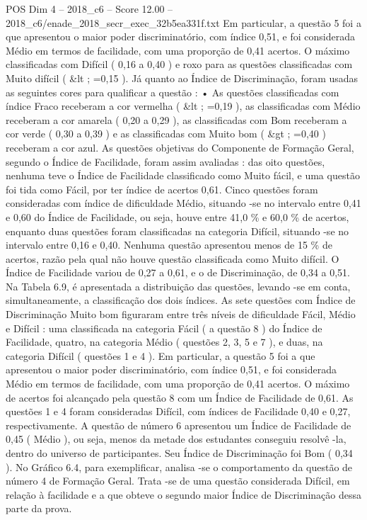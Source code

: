 \begin{textsample}{POS Dim 4 – 2018\_c6 – Score 12.00 – 2018\_c6/enade\_2018\_secr\_exec\_32b5ea331f.txt}
Em particular, a questão 5 foi a que apresentou o maior poder discriminatório, com índice 0,51, e foi considerada Médio em termos de facilidade, com uma proporção de 0,41 acertos.
O máximo classificadas com Difícil ( 0,16 a 0,40 ) e roxo para as questões classificadas com Muito difícil ( \&lt ; =0,15 ).
Já quanto ao Índice de Discriminação, foram usadas as seguintes cores para qualificar a questão : • As questões classificadas com índice Fraco receberam a cor vermelha ( \&lt ; =0,19 ), as classificadas com Médio receberam a cor amarela ( 0,20 a 0,29 ), as classificadas com Bom receberam a cor verde ( 0,30 a 0,39 ) e as classificadas com Muito bom ( \&gt ; =0,40 ) receberam a cor azul.
As questões objetivas do Componente de Formação Geral, segundo o Índice de Facilidade, foram assim avaliadas : das oito questões, nenhuma teve o Índice de Facilidade classificado como Muito fácil, e uma questão foi tida como Fácil, por ter índice de acertos 0,61.
Cinco questões foram consideradas com índice de dificuldade Médio, situando -se no intervalo entre 0,41 e 0,60 do Índice de Facilidade, ou seja, houve entre 41,0 \% e 60,0 \% de acertos, enquanto duas questões foram classificadas na categoria Difícil, situando -se no intervalo entre 0,16 e 0,40.
Nenhuma questão apresentou menos de 15 \% de acertos, razão pela qual não houve questão classificada como Muito difícil.
O Índice de Facilidade variou de 0,27 a 0,61, e o de Discriminação, de 0,34 a 0,51.
Na Tabela 6.9, é apresentada a distribuição das questões, levando -se em conta, simultaneamente, a classificação dos dois índices.
As sete questões com Índice de Discriminação Muito bom figuraram entre três níveis de dificuldade Fácil, Médio e Difícil : uma classificada na categoria Fácil ( a questão 8 ) do Índice de Facilidade, quatro, na categoria Médio ( questões 2, 3, 5 e 7 ), e duas, na categoria Difícil ( questões 1 e 4 ).
Em particular, a questão 5 foi a que apresentou o maior poder discriminatório, com índice 0,51, e foi considerada Médio em termos de facilidade, com uma proporção de 0,41 acertos.
O máximo de acertos foi alcançado pela questão 8 com um Índice de Facilidade de 0,61.
As questões 1 e 4 foram consideradas Difícil, com índices de Facilidade 0,40 e 0,27, respectivamente.
A questão de número 6 apresentou um Índice de Facilidade de 0,45 ( Médio ), ou seja, menos da metade dos estudantes conseguiu resolvê -la, dentro do universo de participantes.
Seu Índice de Discriminação foi Bom ( 0,34 ).
No Gráfico 6.4, para exemplificar, analisa -se o comportamento da questão de número 4 de Formação Geral.
Trata -se de uma questão considerada Difícil, em relação à facilidade e a que obteve o segundo maior Índice de Discriminação dessa parte da prova.

\end{textsample}
